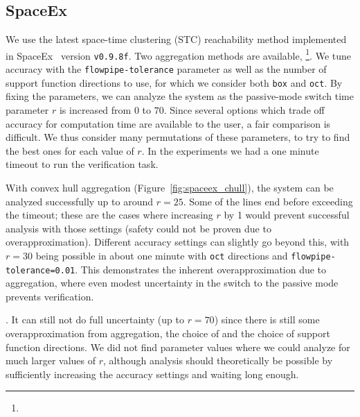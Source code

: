 \subsection{SpaceEx}

We use the latest space-time clustering (STC) reachability method implemented in SpaceEx~\cite{frehse2013flowpipe} version \texttt{v0.9.8f}.
%
Two aggregation methods are available, \footnote{}\new{)}.
%
We tune accuracy with the \texttt{flowpipe-tolerance} parameter as well as the number of support function directions to use, for which we consider
both \texttt{box} and \texttt{oct}.
%
By fixing the parameters, we can analyze the system as the passive-mode switch time parameter $r$ is increased from $0$ to $70$.
%
Since several options which trade off accuracy for computation time are available to the user, a fair comparison is difficult.
%
We thus consider many permutations of these parameters, to try to find the best ones for each value of $r$.
%
In the experiments we had a one minute timeout to run the verification task.

With convex hull aggregation (Figure~\ref{fig:spaceex_chull}), the system can be analyzed successfully up to around $r=25$.
%
Some of the lines end before exceeding the timeout; these are the cases where increasing $r$ by 1 would prevent
successful analysis with those settings (safety could not be proven due to overapproximation).
%
Different accuracy settings can slightly go beyond this, with $r=30$ being possible in about one minute with \texttt{oct} directions and
\texttt{flowpipe-tolerance=0.01}.
%
This demonstrates the inherent overapproximation due to aggregation, where even modest uncertainty in the switch to the passive mode
prevents verification.


.
%
It can still not do full uncertainty (up to $r=70$) since there is still some overapproximation from aggregation, the choice of  and the
choice of support function directions.
%
We did not find parameter values where we could analyze for much larger values of $r$,
although analysis should theoretically be possible by sufficiently increasing the accuracy settings and waiting long enough.


